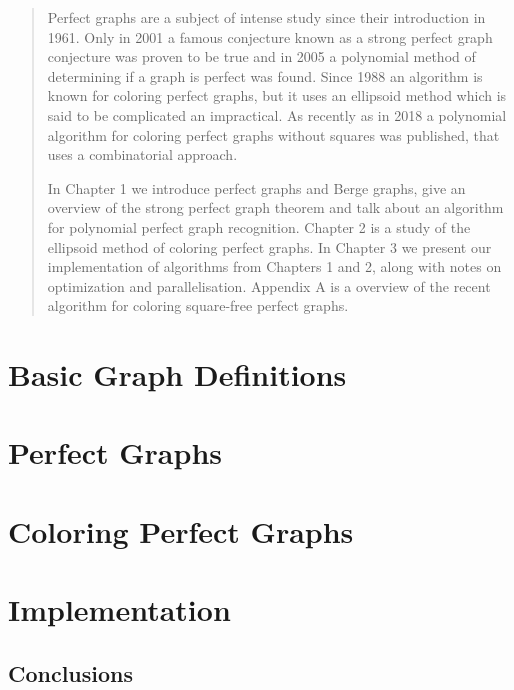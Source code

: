 \documentclass{report}
\author{Adrian Siwiec}
\date{\today{}}
\begin{document}

\pagebreak

\begin{abstract}
	Perfect graphs are a subject of intense study since their introduction in 1961. Only in 2001 a famous conjecture known as a strong perfect graph conjecture was proven to be true and in 2005 a polynomial method of determining if a graph is perfect was found. Since 1988 an algorithm is known for coloring perfect graphs, but it uses an ellipsoid method which is said to be complicated an impractical. As recently as in 2018 a polynomial algorithm for coloring perfect graphs without squares was published, that uses a combinatorial approach.

	In Chapter 1 we introduce perfect graphs and Berge graphs, give an overview of the strong perfect graph theorem and talk about an algorithm for polynomial perfect graph recognition. Chapter 2 is a study of the ellipsoid method of coloring perfect graphs. In Chapter 3 we present our implementation of algorithms from Chapters 1 and 2, along with notes on optimization and parallelisation. Appendix A is a overview of the recent algorithm for coloring square-free perfect graphs.
\end{abstract}

\listoftheorems[ignoreall,show={defn}]
\renewcommand{\listtheoremname}{List of algorithms}
\listoftheorems[ignoreall,show={alg}]
\tableofcontents

\pagebreak

\chapter{Basic Graph Definitions}


\chapter{Perfect Graphs}


\chapter{Coloring Perfect Graphs}


\chapter{Implementation}


\section{Conclusions}

\appendix
\appendixpage
\addappheadtotoc



% 
\printbibliography

% 	
\end{document}
